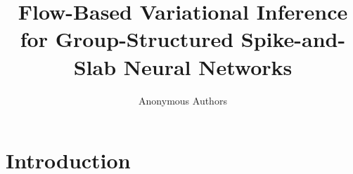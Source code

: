 \documentclass{article}
\title{Flow-Based Variational Inference for Group-Structured
Spike-and-Slab Neural Networks}
\author{Anonymous Authors}
\begin{document}
\maketitle



\begin{abstract}


\end{abstract}



\section{Introduction}
\label{sec:introduction}

%
%
%
%
%


\end{document}
